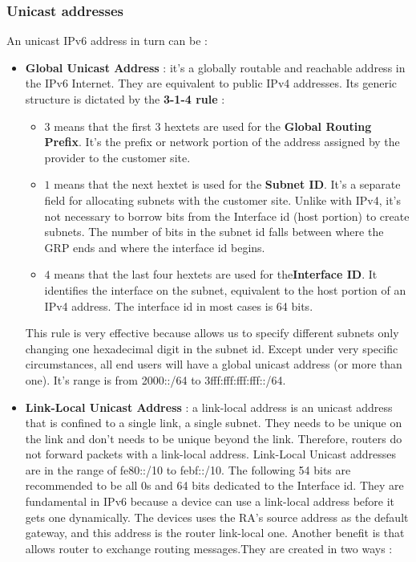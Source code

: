 \documentclass[11pt]{article}
\begin{document}
\subsubsection{Unicast addresses}
An unicast IPv6 address in turn can be :
\begin{itemize}
\item \textbf{Global Unicast Address} : it's a globally routable and reachable address in the IPv6 Internet. They are equivalent to public IPv4 addresses. Its generic structure is dictated by the \textbf{3-1-4 rule} : 
\begin{itemize}
\item $3$ means that the first $3$ hextets are used for the \textbf{Global Routing Prefix}. It's the prefix or network portion of the address assigned by the provider to the customer site.
\item $1$ means that the next hextet is used for the \textbf{Subnet ID}. It's a separate field for allocating subnets with the customer site. Unlike with IPv4, it's not necessary to borrow bits from the Interface id (host portion) to create subnets. The number of bits in the subnet id falls between where the GRP ends and where the interface id begins.
\item $4$ means that the last four hextets are used for the\textbf{Interface ID}. It identifies the interface on the subnet, equivalent to the host portion of an IPv4 address. The interface id in most cases is 64 bits.
\end{itemize}
This rule is very effective because allows us to specify different subnets only changing one hexadecimal digit in the subnet id. Except under very specific circumstances, all end users will have a global unicast address (or more than one). It's range is from 2000::/64 to 3fff:fff:fff:fff::/64.
\item \textbf{Link-Local Unicast Address} : a link-local address is an unicast address that is confined to a single link, a single subnet. They needs to be unique on the link and don't needs to be unique beyond the link. Therefore, routers do not forward packets with a link-local address. Link-Local Unicast  addresses are in the range of fe80::/10 to febf::/10. The following 54 bits are recommended to be all 0s and 64 bits dedicated to the Interface id. They are fundamental in IPv6 because a device can use a link-local address before it gets one dynamically. The devices uses the RA's source address as the default gateway, and this address is the router link-local one. Another benefit is that allows router to exchange routing messages.They are created in two ways :

\end{itemize}
\end{document}
